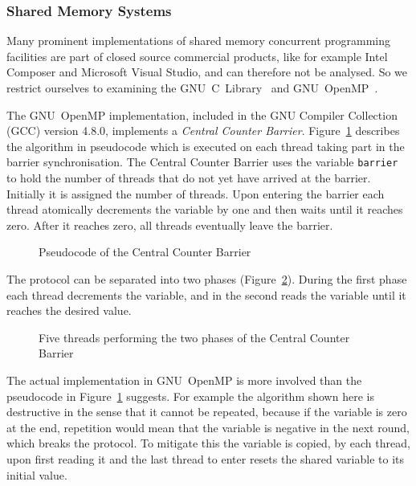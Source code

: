 \documentclass[a4paper, 10pt]{article}
\begin{document}
\subsubsection{Shared Memory Systems}
\label{sssec:background-currently-used-shared}

Many prominent implementations of shared memory concurrent programming facilities are part of closed source commercial products, like for example Intel Composer and Microsoft Visual Studio, and can therefore not be analysed. So we restrict ourselves to examining the GNU~C~Library~\cite{glibc} and GNU~OpenMP~\cite{gomp}.

The GNU~OpenMP implementation, included in the GNU Compiler Collection (GCC) version 4.8.0, implements a \emph{Central Counter Barrier}. Figure~\ref{fig:pseudocode-central-counter} describes the algorithm in pseudocode which is executed on each thread taking part in the barrier synchronisation.
The Central Counter Barrier uses the variable \texttt{barrier} to hold the number of threads that do not yet have arrived at the barrier. Initially it is assigned the number of threads. Upon entering the barrier each thread atomically decrements the variable by one and then waits until it reaches zero. After it reaches zero, all threads eventually leave the barrier.

\begin{figure}[H]
	\centering
	
	\caption{Pseudocode of the Central Counter Barrier}
	\label{fig:pseudocode-central-counter}
\end{figure}

The protocol can be separated into two phases (Figure~\ref{fig:diagram-central-counter}). During the first phase each thread decrements the variable, and in the second reads the variable until it reaches the desired value.

\begin{figure}[H]
	\centering
	
	\caption{Five threads performing the two phases of the Central Counter Barrier}
	\label{fig:diagram-central-counter}
\end{figure}

The actual implementation in GNU~OpenMP is more involved than the pseudocode in Figure~\ref{fig:pseudocode-central-counter} suggests. For example the algorithm shown here is destructive in the sense that it cannot be repeated, because if the variable is zero at the end, repetition would mean that the variable is negative in the next round, which breaks the protocol. To mitigate this the variable is copied, by each thread, upon first reading it and the last thread to enter resets the shared variable to its initial value.
\end{document}
